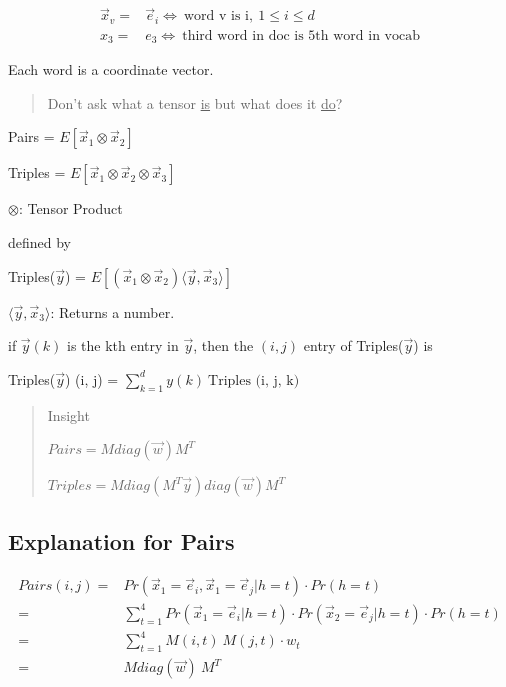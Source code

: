 \documentclass[11pt]{article}
\begin{document}
\begin{equation}
\begin{split}
\vec x_v = & \vec e_i \iff \ \text{word v is i}, \ 1 \leq i \leq d\\
x_3 = & e_3 \iff \ \text{third word in doc is 5th word in vocab}
\end{split}
\end{equation}

Each word is a coordinate vector.

\begin{quote}
Don't ask what a tensor \uline{is} but what does it \uline{do}?
\end{quote}

Pairs = \(E[\vec x_1 \otimes \vec x_2]\)

Triples = \(E[\vec x_1 \otimes \vec x_2 \otimes \vec x_3]\)

\(\otimes\): Tensor Product


defined by

Triples(\(\vec y\)) = \(E[(\vec x_1 \otimes \vec x_2) \langle \vec y, \vec x_3
\rangle]\)

\(\langle \vec y, \vec x_3 \rangle\): Returns a number.

if \(\vec y(k)\) is the kth entry in \(\vec y\), then the \((i, j)\) entry of
Triples(\(\vec y\)) is


Triples(\(\vec y\)) (i, j) = \(\sum_{k = 1}^{d} y(k) \ \text{Triples (i, j, k)}\)


\begin{quote}
Insight

\(Pairs = M diag(\vec w) M^T\)

\(Triples = M diag(M^T \vec y) diag(\vec w) M^T\)
\end{quote}

\subsection{Explanation for Pairs}
\label{sec:org6a5d91c}

\begin{equation}
\begin{split}
Pairs(i, j) = & Pr(\vec x_1 = \vec e_i, \vec x_1 = \vec e_j | h = t) \cdot Pr (h = t)\\
= & \sum_{t = 1}^{4} Pr(\vec x_1 = \vec e_i | h = t) \cdot Pr(\vec x_2 = \vec e_j | h = t) \cdot Pr(h = t)\\
= & \sum_{t = 1}^{4} M (i, t) \ M(j, t) \cdot w_t\\
= & M diag(\vec w) \ M^T
\end{split}
\end{equation}
\end{document}
